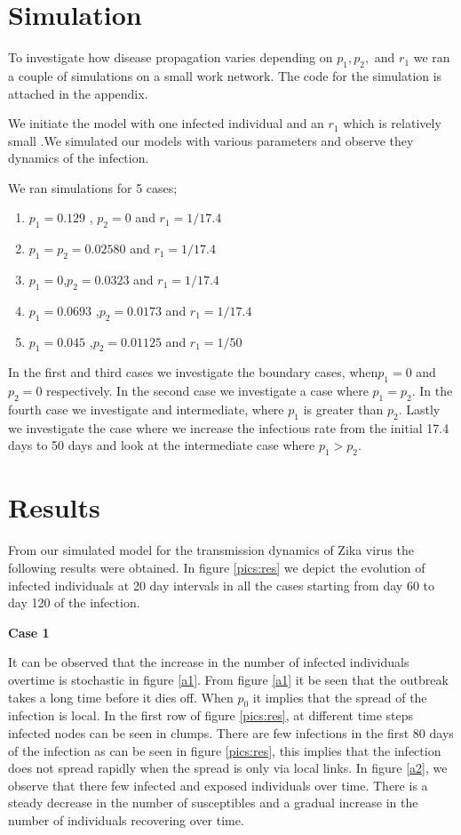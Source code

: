 \section{Simulation}
To investigate how disease propagation varies depending on $p_1, p_2, $ and $r_1$ we ran a couple of simulations on a small work network. The code for the simulation is attached in the appendix. 

We initiate the model with one infected individual and an $r_1$ which is relatively small .We simulated our models with various parameters and observe they dynamics  of the infection. 

We ran simulations for 5 cases;
\begin{enumerate}
\item $p_1 = 0.129$ , $p_2 =0$ and $r_1 = 1/17.4$
\item $p_1 = p_2 = 0.02580$ and $r_1 = 1/17.4$ 
\item $p_1 =0 $,$p_2 = 0.0323$ and $r_1 = 1/17.4$
\item $p_1 = 0.0693$ ,$p_2 = 0.0173$ and $r_1 = 1/17.4$
\item $p_1 = 0.045$ ,$p_2 = 0.01125$ and $r_1 = 1/50$
\end{enumerate}

In the first  and third cases we investigate the boundary cases, when$p_1 = 0$ and  $p_2 = 0$ respectively.  In the second case we investigate a case where $p_1 = p_2$. In the    fourth case we investigate and intermediate, where $p_1$ is greater than $p_2$. Lastly we investigate the case where we increase the infectious rate from the initial 17.4 days to 50 days and look at the intermediate case where $p_1 > p_2$. 

\newpage
\section{Results} 

From our simulated model for the transmission dynamics of Zika virus the following results were obtained. In figure \ref{pics:res} we depict the evolution of infected individuals at 20 day intervals in all the cases starting from day 60 to day 120 of the infection.

\textbf{Case 1}


It can be observed that the increase in the number of infected individuals overtime is stochastic in figure \ref{a1}.  From figure \ref{a1} it be seen that the outbreak takes a long time before it dies off. When $p_0$ it implies that the spread of the infection is local. In the first row  of figure \ref{pics:res}, at different time steps infected nodes can be seen in clumps. There are few infections in the first 80 days of the infection as can be seen  in figure \ref{pics:res}, this implies that the infection does not spread rapidly when the spread is only via local links. In figure \ref{a2}, we observe that there few infected and exposed individuals over time. There is a steady decrease in the number of susceptibles and a gradual increase in the number of individuals recovering over time. 

